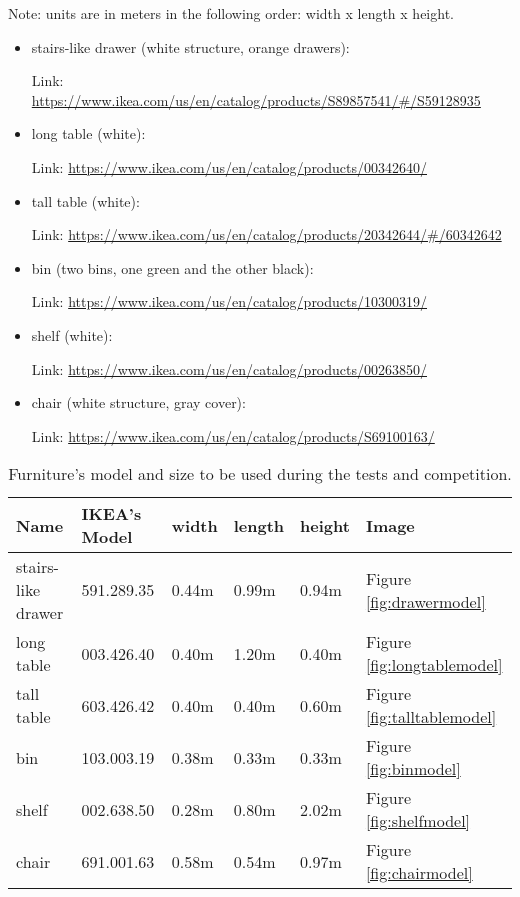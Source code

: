 \documentclass{article}
\begin{document}
Note: units are in meters in the following order:  width x length x height.

\begin{itemize}
    \item stairs-like drawer (white structure, orange drawers):
    
    Link: \url{https://www.ikea.com/us/en/catalog/products/S89857541/#/S59128935}

    \item long table (white):

    Link: \url{https://www.ikea.com/us/en/catalog/products/00342640/}

    \item tall table (white):

    Link: \url{https://www.ikea.com/us/en/catalog/products/20342644/#/60342642}

    \item bin (two bins, one green and the other black):

    Link: \url{https://www.ikea.com/us/en/catalog/products/10300319/}

    \item  shelf (white):

    Link: \url{https://www.ikea.com/us/en/catalog/products/00263850/}

    \item chair (white structure, gray cover):

    Link: \url{https://www.ikea.com/us/en/catalog/products/S69100163/}
\end{itemize}

\begin{table}[h!]
\begin{center}
\begin{tabular}{ |M{2.0cm}|M{2.0cm}|M{1.0cm}|M{1.0cm}|M{1.0cm}|M{1.5cm}| }
    \hline
    Name & IKEA's Model & width & length & height & Image\\
    \hline
    stairs-like drawer & 591.289.35 & 0.44m & 0.99m & 0.94m & Figure \ref{fig:drawermodel}\\
    \hline
    long table & 003.426.40 & 0.40m & 1.20m & 0.40m & Figure \ref{fig:longtablemodel}\\
    \hline
    tall table & 603.426.42 & 0.40m & 0.40m & 0.60m & Figure \ref{fig:talltablemodel}\\
    \hline
    bin & 103.003.19 & 0.38m & 0.33m & 0.33m & Figure \ref{fig:binmodel}\\
    \hline
    shelf & 002.638.50 & 0.28m & 0.80m & 2.02m & Figure \ref{fig:shelfmodel}\\
    \hline
    chair & 691.001.63 & 0.58m & 0.54m & 0.97m & Figure \ref{fig:chairmodel}\\
    \hline
\end{tabular}
\end{center}
\caption{Furniture's model and size to be used during the tests and competition.}
\label{table:furniture}
\end{table}
\end{document}

